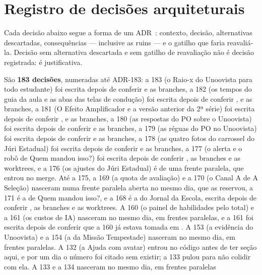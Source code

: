 \chapter{Registro de decisões arquiteturais}
\label{cap:adr}

Cada decisão abaixo segue a forma de um ADR~\cite{nygard2011adr}: contexto,
decisão, alternativas descartadas, consequências --- inclusive as ruins --- e o
gatilho que faria reavaliá-la. Decisão sem alternativa descartada e sem gatilho de
reavaliação não é decisão registrada: é justificativa.

São \textbf{183 decisões}, numeradas até ADR-183: a 183 (o Raio-x do Unoovista para todo estudante) foi escrita depois de conferir  e as branches, a 182 (os tempos do guia da aula e as abas das telas de condução) foi escrita depois de conferir ,  e as branches, a 181 (O Efeito Amplificador e a versão anterior da 2ª série) foi escrita depois de conferir ,  e as branches, a 180 (as respostas do PO sobre o Unoovista) foi escrita depois de conferir  e as branches, a 179 (as réguas do PO no Unoovista) foi escrita depois de conferir  e as branches, a 178 (as quatro fotos do carrossel do Júri Estadual) foi escrita depois de conferir  e as branches, a 177 (o alerta e o robô de Quem mandou isso?) foi escrita depois de conferir , as branches e as worktrees, e a 176 (os ajustes do Júri Estadual) é de uma frente paralela, que entrou no merge. Até a 175, a 169 (a quota de avaliação) e a 170 (o Canal A de A Seleção) nasceram numa frente paralela aberta no mesmo dia, que as reservou, a 171 é a de Quem mandou isso?, e a 168 é a do Jornal da Escola, escrita depois de conferir , as branches e as worktrees. A 160 (o painel de habilidades pelo total) e a 161 (os custos de IA) nasceram no mesmo dia, em frentes paralelas, e a 161 foi escrita depois de conferir que a 160 já estava tomada em . A 153 (a evidência do Unoovista) e a 154 (a da Missão Tempestade) nasceram no mesmo dia, em frentes paralelas. A 132 (a Ajuda com
avatar) entrou no código antes de ter seção aqui, e por um dia o número foi
citado sem existir; a 133 pulou para não colidir com ela. A 133 e a 134 nasceram no mesmo dia, em frentes paralelas
